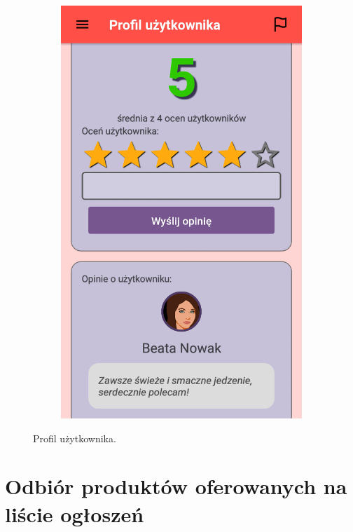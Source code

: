 \documentclass[licencjacka]{pracamgr}
\begin{document}
\begin{figure}[H]
\begin{subfigure}[b]{0.4\linewidth}
\begin{framed}
    \end{framed}
  \end{subfigure}
  \begin{subfigure}[b]{0.4\linewidth}
    \begin{framed}
      \includegraphics[width=\linewidth]{profil2.png}
    \end{framed}
  \end{subfigure}
  \caption{Profil użytkownika.}
  \label{fig:grading}
\end{figure}

\section{Odbiór produktów oferowanych na liście ogłoszeń}
\end{document}
